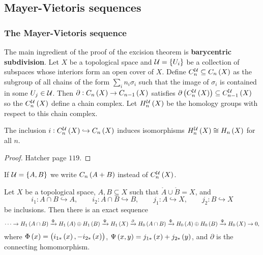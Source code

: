 \pagebreak

\subsection{Mayer-Vietoris sequences}

\subsubsection{The Mayer-Vietoris sequence}

The main ingredient of the proof of the excision theorem is \textbf{barycentric subdivision}. Let $ X $ be a topological space and $ \UU = \cbr{U_i} $ be a collection of subspaces whose interiors form an open cover of $ X $. Define $ C_n^\UU \subseteq C_n\br{X} $ as the subgroup of all chains of the form $ \sum_i n_i\sigma_i $ such that the image of $ \sigma_i $ is contained in some $ U_j \in \mathcal{U} $. Then $ \partial : C_n\br{X} \to C_{n - 1}\br{X} $ satisfies $ \partial\br{C_n^\UU\br{X}} \subseteq C_{n - 1}^\UU\br{X} $ so the $ C_n^\UU\br{X} $ define a chain complex. Let $ H_n^\UU\br{X} $ be the homology groups with respect to this chain complex.

\begin{proposition}
The inclusion $ i : C_n^\UU\br{X} \hookrightarrow C_n\br{X} $ induces isomorphisms $ H_n^\UU\br{X} \cong H_n\br{X} $ for all $ n $.
\end{proposition}

\begin{proof}
Hatcher page $ 119 $.
\end{proof}

\begin{notation*}
If $ \UU = \cbr{A, B} $ we write $ C_n\br{A + B} $ instead of $ C_n^\UU\br{X} $.
\end{notation*}

\begin{theorem}
Let $ X $ be a topological space, $ A, B \subseteq X $ such that $ \mathring{A} \cup \mathring{B} = X $, and
$$ i_1 : A \cap B \hookrightarrow A, \qquad i_2 : A \cap B \hookrightarrow B, \qquad j_1 : A \hookrightarrow X, \qquad j_2 : B \hookrightarrow X $$
be inclusions. Then there is an exact sequence
$$ \dots \to H_1\br{A \cap B} \xrightarrow{\Phi} H_1\br{A} \oplus H_1\br{B} \xrightarrow{\Psi} H_1\br{X} \xrightarrow{\partial} H_0\br{A \cap B} \xrightarrow{\Phi} H_0\br{A} \oplus H_0\br{B} \xrightarrow{\Psi} H_0\br{X} \to 0, $$
where $ \Phi\br{x} = \br{i_{1*}\br{x}, -i_{2*}\br{x}} $, $ \Psi\br{x, y} = j_{1*}\br{x} + j_{2*}\br{y} $, and $ \partial $ is the connecting homomorphism.
\end{theorem}

